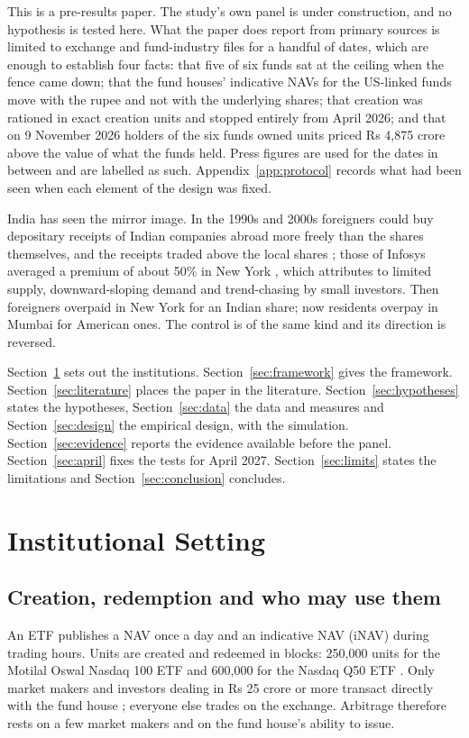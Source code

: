 \documentclass[11pt,a4paper]{article}
\theoremstyle{definition}
\begin{document}
This is a pre-results paper. The study's own panel is under construction, and no hypothesis is tested here. What the paper does report from primary sources is limited to exchange and fund-industry files for a handful of dates, which are enough to establish four facts: that five of six funds sat at the ceiling when the fence came down; that the fund houses' indicative NAVs for the US-linked funds move with the rupee and not with the underlying shares; that creation was rationed in exact creation units and stopped entirely from April 2026; and that on 9 November 2026 holders of the six funds owned units priced Rs 4,875 crore above the value of what the funds held. Press figures are used for the dates in between and are labelled as such. Appendix~\ref{app:protocol} records what had been seen when each element of the design was fixed.

India has seen the mirror image. In the 1990s and 2000s foreigners could buy depositary receipts of Indian companies abroad more freely than the shares themselves, and the receipts traded above the local shares \citep{jithendranathan2000barriers,stigler2010understanding}; those of Infosys averaged a premium of about 50\% in New York \citep{financeasia2003}, which \citet{puthenpurackal2006explaining} attributes to limited supply, downward-sloping demand and trend-chasing by small investors. Then foreigners overpaid in New York for an Indian share; now residents overpay in Mumbai for American ones. The control is of the same kind and its direction is reversed.

Section~\ref{sec:institutions} sets out the institutions. Section~\ref{sec:framework} gives the framework. Section~\ref{sec:literature} places the paper in the literature. Section~\ref{sec:hypotheses} states the hypotheses, Section~\ref{sec:data} the data and measures and Section~\ref{sec:design} the empirical design, with the simulation. Section~\ref{sec:evidence} reports the evidence available before the panel. Section~\ref{sec:april} fixes the tests for April 2027. Section~\ref{sec:limits} states the limitations and Section~\ref{sec:conclusion} concludes.

\section{Institutional Setting}\label{sec:institutions}
\subsection{Creation, redemption and who may use them}
An ETF publishes a NAV once a day and an indicative NAV (iNAV) during trading hours. Units are created and redeemed in blocks: 250,000 units for the Motilal Oswal Nasdaq 100 ETF \citep{motilal2026sid} and 600,000 for the Nasdaq Q50 ETF \citep{indmoney2026unwind}. Only market makers and investors dealing in Rs 25 crore or more transact directly with the fund house \citep{mirae2026factsheet}; everyone else trades on the exchange. Arbitrage therefore rests on a few market makers and on the fund house's ability to issue.
\end{document}
